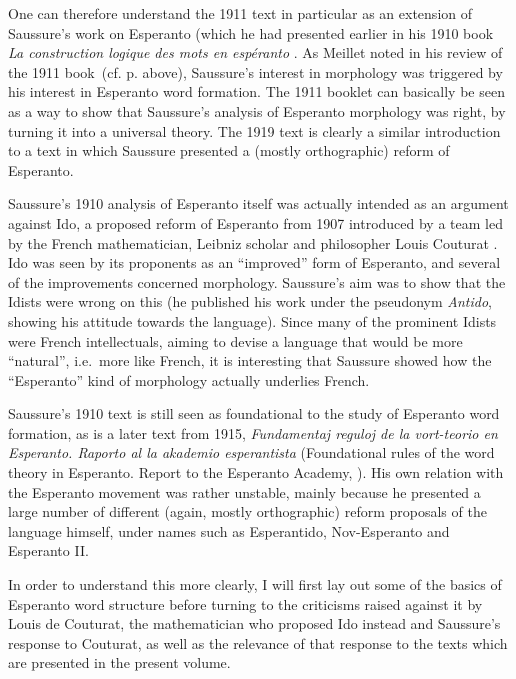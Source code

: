 \documentclass[output=paper]{langsci/langscibook}
\begin{document}
One can therefore understand the 1911 text in particular as an
extension of Saussure's work on Esperanto (which he had presented
earlier in his 1910 book \emph{La construction logique des mots en
  espéranto} \citep{saussur1910}. As Meillet noted in his review of
the 1911 book~(cf. p. \pageref{sec:meillet-review} above), Saussure's
interest in morphology was triggered by his interest in Esperanto word
formation. The 1911 booklet can basically be seen as a way to show
that Saussure's analysis of Esperanto morphology was right, by turning
it into a universal theory. The 1919 text is clearly a similar
introduction to a text in which Saussure presented a (mostly
orthographic) reform of Esperanto.

Saussure's 1910 analysis of Esperanto itself was actually intended as
an argument against Ido, a proposed reform of Esperanto from 1907
introduced by a team led by the French mathematician, Leibniz scholar
and philosopher Louis Couturat \citep{couturat1907, couturat1908}. Ido
was seen by its proponents as an ``improved'' form of Esperanto, and
several of the improvements concerned morphology. Saussure's aim was
to show that the Idists were wrong on this (he published his work
under the pseudonym \emph{Antido}, showing his attitude towards the
language). Since many of the prominent Idists were French
intellectuals, aiming to devise a language that would be more
``natural'', i.e.~more like French, it is interesting that Saussure
showed how the ``Esperanto'' kind of morphology actually underlies
French.

Saussure's 1910 text is still seen as foundational to the study of
Esperanto word formation, as is a later text from 1915,
\emph{Fundamentaj reguloj de la vort-teorio en Esperanto. Raporto al
  la akademio esperantista} (Foundational rules of the word theory in
Esperanto. Report to the Esperanto Academy,
\citealt{saussure1915}). His own relation with the Esperanto movement
was rather unstable, mainly because he presented a large number of
different (again, mostly orthographic) reform proposals of the
language himself, under names such as Esperantido, Nov-Esperanto and
Esperanto II.

In order to understand this more clearly, I will first lay out some of
the basics of Esperanto word structure before turning to the
criticisms raised against it by Louis de Couturat, the mathematician
who proposed Ido instead and Saussure's response to Couturat, as well
as the relevance of that response to the texts which are presented in
the present volume.
\end{document}
